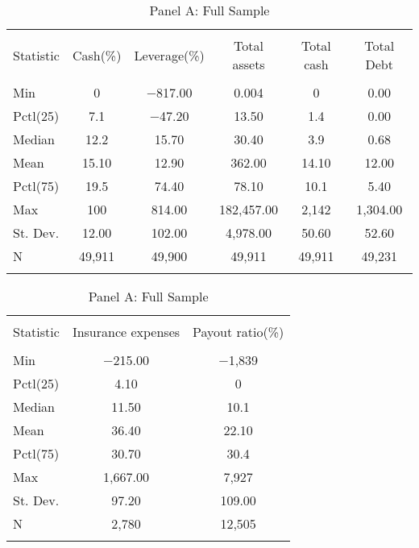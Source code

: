 
\begin{table}[!htbp] \centering 
  \caption{Panel A: Full Sample} 
  \label{} 
\begin{tabular}{@{\extracolsep{5pt}}lccccc} 
\\[-1.8ex]\hline 
\hline \\[-1.8ex] 
Statistic & Cash(\%) & Leverage(\%) & Total assets & Total cash & Total Debt \\ 
\hline \\[-1.8ex] 
Min & 0 & $-$817.00 & 0.004 & 0 & 0.00 \\ 
Pctl(25) & 7.1 & $-$47.20 & 13.50 & 1.4 & 0.00 \\ 
Median & 12.2 & 15.70 & 30.40 & 3.9 & 0.68 \\ 
Mean & 15.10 & 12.90 & 362.00 & 14.10 & 12.00 \\ 
Pctl(75) & 19.5 & 74.40 & 78.10 & 10.1 & 5.40 \\ 
Max & 100 & 814.00 & 182,457.00 & 2,142 & 1,304.00 \\ 
St. Dev. & 12.00 & 102.00 & 4,978.00 & 50.60 & 52.60 \\ 
N & 49,911 & 49,900 & 49,911 & 49,911 & 49,231 \\ 
\hline \\[-1.8ex] 
\end{tabular} 
\end{table} 

\begin{table}[!htbp] \centering 
  \caption{Panel A: Full Sample} 
  \label{} 
\begin{tabular}{@{\extracolsep{5pt}}lcc} 
\\[-1.8ex]\hline 
\hline \\[-1.8ex] 
Statistic & Insurance expenses & Payout ratio(\%) \\ 
\hline \\[-1.8ex] 
Min & $-$215.00 & $-$1,839 \\ 
Pctl(25) & 4.10 & 0 \\ 
Median & 11.50 & 10.1 \\ 
Mean & 36.40 & 22.10 \\ 
Pctl(75) & 30.70 & 30.4 \\ 
Max & 1,667.00 & 7,927 \\ 
St. Dev. & 97.20 & 109.00 \\ 
N & 2,780 & 12,505 \\ 
\hline \\[-1.8ex] 
\end{tabular} 
\end{table} 

